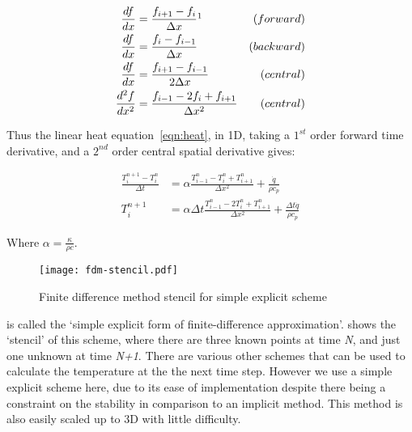 \begin{subequations}
\begin{align}
\frac{df}{dx} &= \frac{f_{i+1} - f_{i}}{\Delta x}\footnotemark  &(forward) \label{eqn:fdmfwd}\\
\frac{df}{dx} &= \frac{f_{i} - f_{i-1}}{\Delta x}  &(backward) \label{eqn:fdmbck}\\
\frac{df}{dx} &= \frac{f_{i+1} - f_{i-1}}{2\Delta x}  &(central)\label{eqn:fdmcent}\\
\frac{d^2f}{dx^2} &= \frac{f_{i-1}-2f_i+f_{i+1}}{\Delta x^2} &(central)\label{eqn:fdmcent2}
\end{align}
\end{subequations}

Thus the linear heat equation~\cref{eqn:heat}, in 1D, taking a $1^{st}$ order forward time derivative, and a $2^{nd}$ order central spatial derivative gives:

\begin{subequations}
\begin{align}
\frac{T^{n+1}_i-T^{n}_i}{\Delta t} &= \alpha\frac{T^n_{i-1}-T^n_{i}+T^n_{i+1}}{\Delta x^2}  + \frac{\dot{q}}{\rho c_p}\\
T_{i}^{n+1} &=  \alpha\Delta t \frac{T_{i-1}^n-2T_i^n+T_{i+1}^n}{\Delta x^2} + \frac{\Delta t\dot{q}}{\rho c_p}
\label{eqn:simplefdm}
\end{align}
\end{subequations}

Where $\alpha=\tfrac{\kappa}{\rho c}$.

\begin{figure}
  \begin{center}
    \texttt{[image: fdm-stencil.pdf]}
  \end{center}
  \caption{Finite difference method stencil for simple explicit scheme}\label{fig:fdmstencil}
\end{figure}

 is called the `simple explicit form of finite-difference approximation'\cite{ozisik1994finite}.  shows the `stencil' of this scheme, where there are three known points at time \textit{N}, and just one unknown at time \textit{N+1}. There are various other schemes that can be used to calculate the temperature at the the next time step. However we use a simple explicit scheme here, due to its ease of implementation despite there being a constraint on the stability in comparison to an implicit method. This method is also easily scaled up to 3D with little difficulty.

